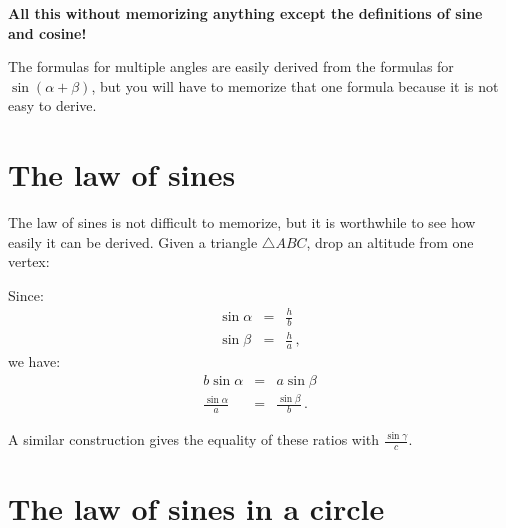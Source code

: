 \documentclass[11pt,a4paper]{article}
\begin{document}
\textbf{\large All this without memorizing anything except the definitions of sine and cosine!}

\bigskip

The formulas for multiple angles are easily derived from the formulas for $\sin(\alpha+\beta)$, but you will have to memorize that one formula because it is not easy to derive.

\newpage

\appendix

\section{The law of sines}

The law of sines is not difficult to memorize, but it is worthwhile to see how easily it can be derived. Given a triangle $\triangle ABC$, drop an altitude from one vertex:
\begin{center}
\end{center}
Since:
\begin{eqnarray*}
\sin\alpha &=& \frac{h}{b}\\
\sin\beta &=& \frac{h}{a}\,,
\end{eqnarray*}
we have:
\begin{eqnarray*}
b\sin\alpha &=& a\sin\beta\\
\frac{\sin\alpha}{a} &=& \frac{\sin\beta}{b}\,.
\end{eqnarray*}

A similar construction gives the equality of these ratios with $\displaystyle\frac{\sin\gamma}{c}$.


\section{The law of sines in a circle}
\end{document}
